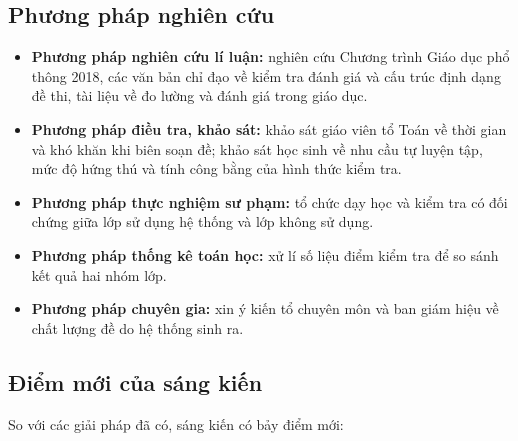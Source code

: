 \subsection{Phương pháp nghiên cứu}

\begin{itemize}[leftmargin=1.2cm, itemsep=2pt]
  \item \textbf{Phương pháp nghiên cứu lí luận:} nghiên cứu Chương trình Giáo
        dục phổ thông 2018, các văn bản chỉ đạo về kiểm tra đánh giá và cấu
        trúc định dạng đề thi, tài liệu về đo lường và đánh giá trong giáo dục.
  \item \textbf{Phương pháp điều tra, khảo sát:} khảo sát giáo viên tổ Toán về
        thời gian và khó khăn khi biên soạn đề; khảo sát học sinh về nhu cầu tự
        luyện tập, mức độ hứng thú và tính công bằng của hình thức kiểm tra.
  \item \textbf{Phương pháp thực nghiệm sư phạm:} tổ chức dạy học và kiểm tra
        có đối chứng giữa lớp sử dụng hệ thống và lớp không sử dụng.
  \item \textbf{Phương pháp thống kê toán học:} xử lí số liệu điểm kiểm tra để
        so sánh kết quả hai nhóm lớp.
  \item \textbf{Phương pháp chuyên gia:} xin ý kiến tổ chuyên môn và ban giám
        hiệu về chất lượng đề do hệ thống sinh ra.
\end{itemize}

\subsection{Điểm mới của sáng kiến}

So với các giải pháp đã có, sáng kiến có bảy điểm mới:


